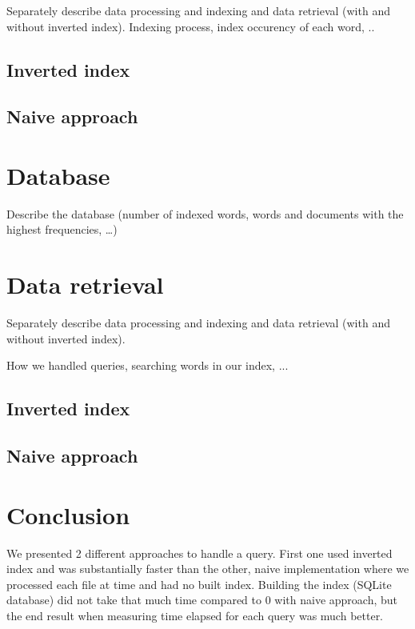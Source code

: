 \documentclass[9pt]{IEEEtran}
\begin{document}
Separately describe data processing and indexing and data retrieval (with and without inverted index).
Indexing process, index occurency of each word, ..
\subsection{Inverted index}

\subsection{Naive approach}

\section{Database}
Describe the database (number of indexed words, words and documents with the highest frequencies, …)

\section{Data retrieval}
\label{section:data_retrieval}

Separately describe data processing and indexing and data retrieval (with and without inverted index).

How we handled queries, searching words in our index, ...
\subsection{Inverted index}

\subsection{Naive approach}

\section{Conclusion}
\label{section:conclusion}
We presented 2 different approaches to handle a query.
First one used inverted index and was substantially faster than the other, naive implementation where we processed each file at time and had no built index.
Building the index (SQLite database) did not take that much time compared to 0 with naive approach, but the end result when measuring time elapsed for each query was much better. 
\end{document}
